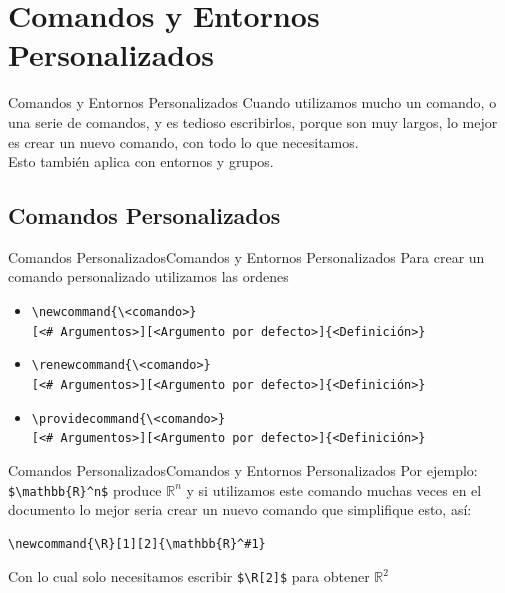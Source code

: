 \documentclass[12pt,aspectratio=43]{beamer}
\begin{document}
\section{Comandos y Entornos Personalizados}
\begin{frame}{Comandos y Entornos Personalizados}{}
Cuando utilizamos mucho un comando, o una serie de comandos, y es tedioso escribirlos, porque son muy largos, lo mejor es crear un nuevo comando, con todo lo que necesitamos.\\[1em]

Esto también aplica con entornos y grupos.
\end{frame}

\subsection{Comandos Personalizados}
\begin{frame}[fragile]{Comandos Personalizados}{Comandos y Entornos Personalizados}
Para crear un comando personalizado utilizamos las ordenes

\begin{itemize}[<+->]
	\item \lstinline|\newcommand{\<comando>}|\\
	\texttt{[<\# Argumentos>][<Argumento por defecto>]\{<Definición>\}}
	\item \lstinline|\renewcommand{\<comando>}|\\
	\texttt{[<\# Argumentos>][<Argumento por defecto>]\{<Definición>\}}
	\item \lstinline|\providecommand{\<comando>}|\\
	\texttt{[<\# Argumentos>][<Argumento por defecto>]\{<Definición>\}}
\end{itemize}
\end{frame}

\begin{frame}[fragile]{Comandos Personalizados}{Comandos y Entornos Personalizados}
Por ejemplo:\\[1em]

\lstinline|$\mathbb{R}^n$| produce $\mathbb{R}^n$ y si utilizamos este comando muchas veces en el documento lo mejor seria crear un nuevo comando que simplifique esto, así:\\[1em]

\begin{lstlisting}
\newcommand{\R}[1][2]{\mathbb{R}^#1}
\end{lstlisting}\vspace{1em}

Con lo cual solo necesitamos escribir \lstinline|$\R[2]$| para obtener  $\mathbb{R}^2$
\end{frame}
\end{document}
